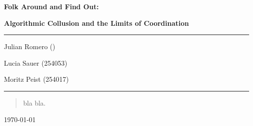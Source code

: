 \documentclass[12pt]{article}
\begin{document}
\begin{titlepage}
	\centering
	\par\vspace{1cm}
	{\huge\bfseries Folk Around and Find Out:\par}
    {\large\bfseries Algorithmic Collusion and the Limits of Coordination\par}
	\vspace{1cm}
    \noindent\rule{\textwidth}{1pt}
    {\Large Julian Romero ()\par}
    {\Large Lucia Sauer (254053)\par}
	{\Large Moritz Peist (254017)\par}
    \noindent\rule{\textwidth}{1pt}
    \vfill
    \begin{abstract}
        \noindent
        bla bla.
    \end{abstract}
	\vfill
	{\large \today\par}
\end{titlepage}

\tableofcontents
\thispagestyle{empty}

\newpage
\addtocounter{page}{-1}

\newpage

\newpage

\newpage

\newpage

\newpage


\newpage
\printbibliography[heading=bibintoc,title={References}]

\newpage

\end{document}

